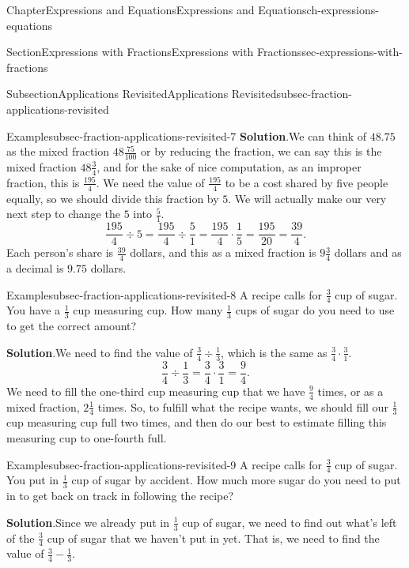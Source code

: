 \documentclass[twoside,11pt,]{book}
\newcommand{\blocktitlefont}{\relax}
\numberwithin{equation}{chapter}
\begin{document}
\begin{chapterptx}{Chapter}{Expressions and Equations}{}{Expressions and Equations}{}{}{ch-expressions-equations}
\begin{sectionptx}{Section}{Expressions with Fractions}{}{Expressions with Fractions}{}{}{sec-expressions-with-fractions}
\begin{subsectionptx}{Subsection}{Applications Revisited}{}{Applications Revisited}{}{}{subsec-fraction-applications-revisited}
\begin{example}{Example}{}{subsec-fraction-applications-revisited-7}
\noindent\textbf{\blocktitlefont Solution}.\hypertarget{subsec-fraction-applications-revisited-7-2}{}\quad{}We can think of \(48.75\) as the mixed fraction \(48\frac{75}{100}\) or by reducing the fraction, we can say this is the mixed fraction \(48\frac34\), and for the sake of nice computation, as an improper fraction, this is \(\frac{195}{4}\). We need the value of \(\frac{195}{4}\) to be a cost shared by five people equally, so we should divide this fraction by \(5\). We will actually make our very next step to change the \(5\) into \(\frac51\).%
\begin{equation*}
\frac{195}{4} \div 5 = \frac{195}{4} \div \frac{5}{1} = \frac{195}{4} \cdot \frac{1}{5} = \frac{195}{20} = \frac{39}{4}.
\end{equation*}
Each person's share is \(\frac{39}{4}\) dollars, and this as a mixed fraction is \(9\frac34\) dollars and as a decimal is \(9.75\) dollars.%
\end{example}
\begin{example}{Example}{}{subsec-fraction-applications-revisited-8}%
A recipe calls for \(\frac{3}{4}\) cup of sugar. You have a \(\frac{1}{3}\) cup measuring cup. How many \(\frac{1}{3}\) cups of sugar do you need to use to get the correct amount?%
\par\smallskip%
\noindent\textbf{\blocktitlefont Solution}.\hypertarget{subsec-fraction-applications-revisited-8-2}{}\quad{}We need to find the value of \(\frac{3}{4} \div \frac{1}{3}\), which is the same as \(\frac{3}{4} \cdot \frac{3}{1}\).%
\begin{equation*}
\frac{3}{4} \div \frac{1}{3} = \frac{3}{4} \cdot \frac{3}{1} = \frac{9}{4}.
\end{equation*}
We need to fill the one-third cup measuring cup that we have \(\frac{9}{4}\) times, or as a mixed fraction, \(2\frac14\) times. So, to fulfill what the recipe wants, we should fill our \(\frac{1}{3}\) cup measuring cup full two times, and then do our best to estimate filling this measuring cup to one-fourth full.%
\end{example}
\begin{example}{Example}{}{subsec-fraction-applications-revisited-9}%
A recipe calls for \(\frac{3}{4}\) cup of sugar. You put in \(\frac{1}{3}\) cup of sugar by accident. How much more sugar do you need to put in to get back on track in following the recipe?%
\par\smallskip%
\noindent\textbf{\blocktitlefont Solution}.\hypertarget{subsec-fraction-applications-revisited-9-2}{}\quad{}Since we already put in \(\frac{1}{3}\) cup of sugar, we need to find out what's left of the \(\frac34\) cup of sugar that we haven't put in yet. That is, we need to find the value of \(\frac{3}{4} - \frac{1}{3}\).%

\end{example}
\end{subsectionptx}
\end{sectionptx}
\end{chapterptx}
\end{document}
